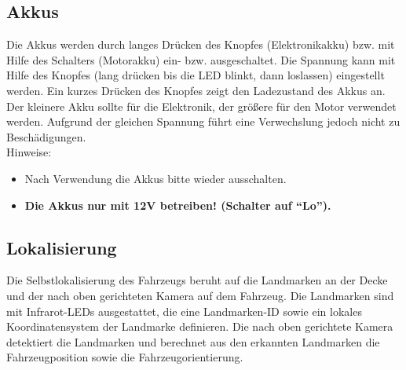 \documentclass[a4paper, 11pt]{article}
\begin{document}
{\subsection{Akkus}
Die Akkus werden durch langes Drücken des Knopfes (Elektronikakku) bzw. mit Hilfe des Schalters (Motorakku) ein- bzw. ausgeschaltet. Die Spannung kann mit Hilfe des Knopfes (lang drücken bis die LED blinkt, dann loslassen) eingestellt werden. Ein kurzes Drücken des Knopfes zeigt den Ladezustand des Akkus an. Der kleinere Akku sollte für die Elektronik, der größere für den Motor verwendet werden. Aufgrund der gleichen Spannung führt eine Verwechslung jedoch nicht zu Beschädigungen.\\
\newline
Hinweise:
\begin{itemize}
\item{Nach Verwendung die Akkus bitte wieder ausschalten.}
\item{\textbf{Die Akkus nur mit 12V betreiben! (Schalter auf "`Lo"').}}
\end{itemize}

\subsection{Lokalisierung}
Die Selbstlokalisierung des Fahrzeugs beruht auf die Landmarken an der Decke und der nach oben gerichteten Kamera auf dem Fahrzeug. Die Landmarken sind mit Infrarot-LEDs ausgestattet, die eine Landmarken-ID sowie ein lokales Koordinatensystem der Landmarke definieren. Die nach oben gerichtete Kamera detektiert die Landmarken und berechnet aus den erkannten Landmarken die Fahrzeugposition sowie die Fahrzeugorientierung.

}
\end{document}

